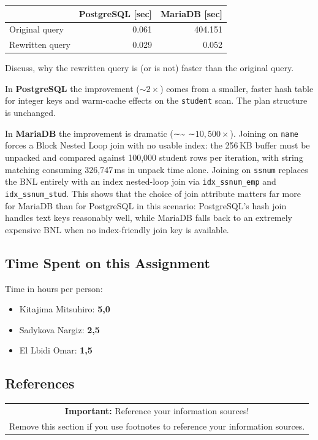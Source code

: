\documentclass[11pt]{scrartcl}
\begin{document}
\begin{table}[H]
  \centering
  \begin{tabular}{l|r|r}
    & PostgreSQL [sec] & MariaDB [sec] \tabularnewline
    \hline
    Original query  & 0.061 & 404.151 \tabularnewline
    Rewritten query & 0.029 & 0.052 \tabularnewline
  \end{tabular}
\end{table}

Discuss, why the rewritten query is (or is not) faster than the original query.

In \textbf{PostgreSQL} the improvement ($\sim$$2\times$) comes from a smaller, faster hash table for integer keys and warm-cache effects on the \texttt{student} scan. The plan structure is unchanged.

In \textbf{MariaDB} the improvement is dramatic (∼\sim
∼$10{,}500\times$). Joining on \texttt{name} forces a Block Nested Loop join with no usable index: the 256\,KB buffer must be unpacked and compared against 100,000 student rows per iteration, with string matching consuming 326,747\,ms in unpack time alone. Joining on \texttt{ssnum} replaces the BNL entirely with an index nested-loop join via \texttt{idx\_ssnum\_emp} and \texttt{idx\_ssnum\_stud}. This shows that the choice of join attribute matters far more for MariaDB than for PostgreSQL in this scenario: PostgreSQL's hash join handles text keys reasonably well, while MariaDB falls back to an extremely expensive BNL when no index-friendly join key is available.

\subsection*{Time Spent on this Assignment}

Time in hours per person:
\begin{itemize}
    \item Kitajima Mitsuhiro: \textbf{5,0}
    \item Sadykova Nargiz: \textbf{2,5}
    \item El Lbidi Omar: \textbf{1,5}
\end{itemize}

\subsection*{References}

\begin{table}[H]
  \centering
  \begin{tabular}{c}
    \hline
    \textbf{Important:} Reference your information sources! \tabularnewline
    Remove this section if you use footnotes to reference your information sources. \tabularnewline
    \hline
  \end{tabular}
\end{table}
\end{document}

